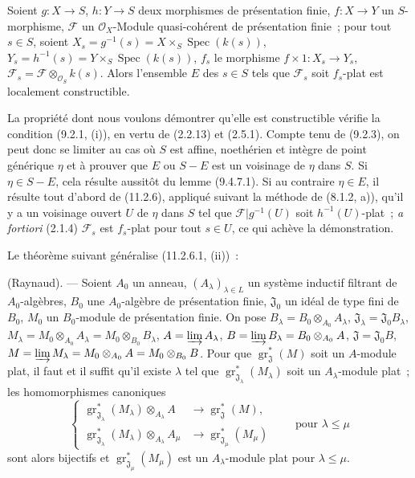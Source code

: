 \begin{proposition}[11.2.8]
\label{IV.11.2.8-fr}
Soient $g:X\to S$, $h:Y\to S$ deux morphismes de présentation finie,
$f:X\to Y$ un $S$-morphisme, $\mathcal F$ un
$\mathcal O_X$-Module quasi-cohérent de présentation finie~; pour tout
$s\in S$, soient $X_s=g^{-1}(s)=X\times_S\operatorname{Spec}(k(s))$,
$Y_s=h^{-1}(s)=Y\times_S\operatorname{Spec}(k(s))$, $f_s$ le morphisme
$f\times1:X_s\to Y_s$, $\mathcal F_s=\mathcal F\otimes_{\mathcal O_S}k(s)$.
Alors l'ensemble $E$ des $s\in S$ tels que $\mathcal F_s$ soit $f_s$-plat
est localement constructible.
\end{proposition}

La propriété dont nous voulons démontrer qu'elle est constructible vérifie la
condition (9.2.1, (i)), en vertu de (2.2.13) et (2.5.1). Compte tenu de
(9.2.3), on peut donc se limiter au cas où $S$ est affine, noethérien et
intègre de point générique $\eta$ et à prouver que $E$ ou $S-E$ est un
voisinage de $\eta$ dans $S$. Si $\eta\in S-E$, cela résulte aussitôt du
lemme (9.4.7.1). Si au contraire $\eta\in E$, il résulte tout d'abord de
(11.2.6), appliqué suivant la méthode de (8.1.2, a)), qu'il y a un voisinage
ouvert $U$ de $\eta$ dans $S$ tel que
$\mathcal F|g^{-1}(U)$ soit $h^{-1}(U)$-plat~; \emph{a fortiori} (2.1.4)
$\mathcal F_s$ est $f_s$-plat pour tout $s\in U$, ce qui achève la
démonstration.

Le théorème suivant généralise (11.2.6.1, (ii))~:

\begin{theorem}[11.2.9]
\label{IV.11.2.9-fr}
(Raynaud). --- Soient $A_0$ un anneau, $(A_\lambda)_{\lambda\in L}$ un système
inductif filtrant de $A_0$-algèbres, $B_0$ une $A_0$-algèbre de présentation
finie, $\mathfrak J_0$ un idéal de type fini de $B_0$, $M_0$ un $B_0$-module
de présentation finie. On pose
$B_\lambda=B_0\otimes_{A_0}A_\lambda$,
$\mathfrak J_\lambda=\mathfrak J_0B_\lambda$,
$M_\lambda=M_0\otimes_{A_0}A_\lambda=M_0\otimes_{B_0}B_\lambda$,
$A=\varinjlim A_\lambda$,
$B=\varinjlim B_\lambda=B_0\otimes_{A_0}A$,
$\mathfrak J=\mathfrak J_0B$,
$M=\varinjlim M_\lambda=M_0\otimes_{A_0}A=M_0\otimes_{B_0}B$. Pour que
$\operatorname{gr}_{\mathfrak J}^*(M)$ soit un $A$-module plat, il faut et il
suffit qu'il existe $\lambda$ tel que
$\operatorname{gr}_{\mathfrak J_\lambda}^*(M_\lambda)$ soit un
$A_\lambda$-module plat~; les homomorphismes canoniques
\begin{equation}
\left\{
\begin{aligned}
\operatorname{gr}_{\mathfrak J_\lambda}^*(M_\lambda)
  \otimes_{A_\lambda}A&\longrightarrow
  \operatorname{gr}_{\mathfrak J}^*(M),\\
\operatorname{gr}_{\mathfrak J_\lambda}^*(M_\lambda)
  \otimes_{A_\lambda}A_\mu&\longrightarrow
  \operatorname{gr}_{\mathfrak J_\mu}^*(M_\mu)
\end{aligned}
\right.
\qquad\text{pour }\lambda\leq\mu
\label{IV.11.2.9.1-fr}
\tag{11.2.9.1}
\end{equation}
sont alors bijectifs et
$\operatorname{gr}_{\mathfrak J_\mu}^*(M_\mu)$ est un $A_\lambda$-module plat
pour $\lambda\leq\mu$.
\end{theorem}

